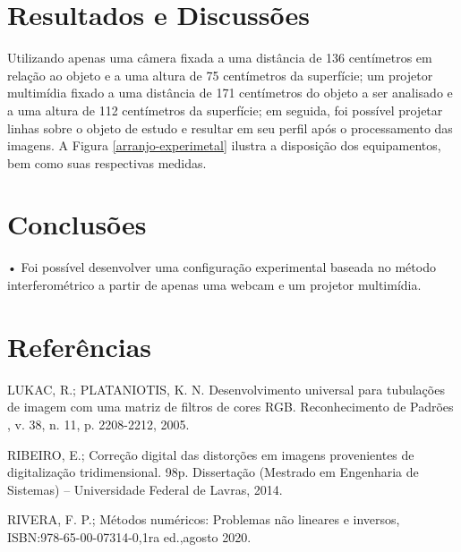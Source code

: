 \documentclass[a4paper, 12pt]{article}
\begin{document}
\section{Resultados e Discussões}

Utilizando apenas uma câmera fixada a uma distância de 136 centímetros em relação ao objeto e a uma altura de 75 centímetros da superfície; um projetor multimídia fixado a uma distância de 171 centímetros do objeto a ser analisado e a uma altura de 112 centímetros da superfície; em seguida, foi possível projetar linhas sobre o objeto de estudo e resultar em seu perfil após o processamento das imagens. A Figura \ref{arranjo-experimetal} ilustra a disposição dos equipamentos, bem como suas respectivas medidas.


\section{Conclusões}

•	Foi possível desenvolver uma configuração experimental baseada no método interferométrico a partir de apenas uma webcam e um projetor multimídia. 


\section*{Referências}

LUKAC, R.; PLATANIOTIS, K. N. Desenvolvimento universal para tubulações de imagem com uma matriz de filtros de cores RGB. Reconhecimento de Padrões , v. 38, n. 11, p. 2208-2212, 2005.
\vspace{.5cm}

RIBEIRO, E.; Correção digital das distorções em imagens provenientes de digitalização tridimensional. 98p. Dissertação (Mestrado em Engenharia de Sistemas) – Universidade Federal de Lavras, 2014. 
\vspace{.5cm}

RIVERA, F. P.; Métodos numéricos: Problemas não lineares e inversos, ISBN:978-65-00-07314-0,1ra ed.,agosto 2020.
\vspace{.5cm}
\end{document}
